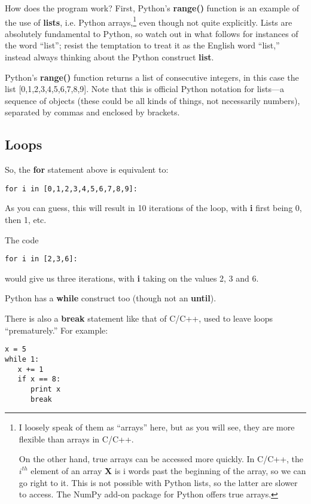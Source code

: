 How does the program work?  First, Python's {\bf range()} function is an
example of the use of {\bf lists}, i.e. Python arrays,\footnote{I
loosely speak of them as ``arrays'' here, but as you will see, they are
more flexible than arrays in C/C++.  

On the other hand, true arrays can be accessed more quickly.  In C/C++,
the $i^{th}$ element of an array {\bf X} is i words past the beginning
of the array, so we can go right to it.  This is not possible with
Python lists, so the latter are slower to access.  The NumPy add-on
package for Python offers true arrays.} even though not quite
explicitly.  Lists are absolutely fundamental to Python, so watch out in
what follows for instances of the word ``list''; resist the temptation
to treat it as the English word ``list,'' instead always thinking about
the Python construct {\bf list}.

Python's {\bf range()} function returns a list of consecutive integers,
in this case the list [0,1,2,3,4,5,6,7,8,9].  Note that this is official
Python notation for lists---a sequence of objects (these could be all
kinds of things, not necessarily numbers), separated by commas and
enclosed by brackets.

\subsection{Loops}

So, the {\bf for} statement above is equivalent to:

\begin{Verbatim}[fontsize=\relsize{-2}]
for i in [0,1,2,3,4,5,6,7,8,9]:
\end{Verbatim}

As you can guess, this will result in 10 iterations of the loop, with
{\bf i} first being 0, then 1, etc.

The code

\begin{Verbatim}[fontsize=\relsize{-2}]
for i in [2,3,6]:
\end{Verbatim}

would give us three iterations, with {\bf i} taking on the values 2, 3
and 6.

Python has a {\bf while} construct too (though not an {\bf until}).

There is also a {\bf break} statement like that of C/C++, used to leave
loops ``prematurely.''  For example:

\begin{Verbatim}[fontsize=\relsize{-2}]
x = 5
while 1:
   x += 1
   if x == 8:
      print x
      break
\end{Verbatim}

